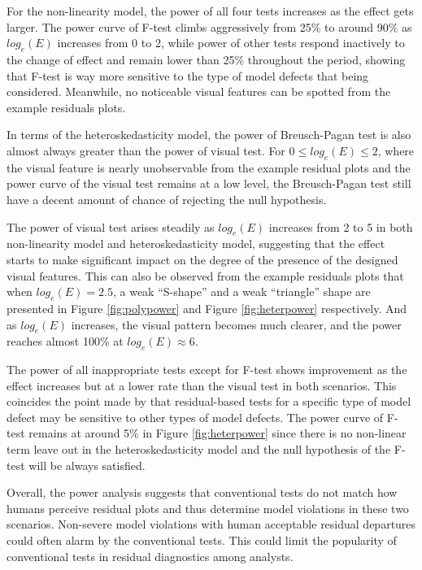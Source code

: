 \documentclass[]{interact}
\theoremstyle{plain}%
\theoremstyle{definition}
\theoremstyle{remark}
\begin{document}
For the non-linearity model, the power of all four tests increases as
the effect gets larger. The power curve of F-test climbs aggressively
from 25\% to around 90\% as \(log_e(E)\) increases from 0 to 2, while
power of other tests respond inactively to the change of effect and
remain lower than 25\% throughout the period, showing that F-test is way
more sensitive to the type of model defects that being considered.
Meanwhile, no noticeable visual features can be spotted from the example
residuals plots.

In terms of the heteroskedasticity model, the power of Breusch-Pagan
test is also almost always greater than the power of visual test. For
\(0 \leq log_e(E) \leq 2\), where the visual feature is nearly
unobservable from the example residual plots and the power curve of the
visual test remains at a low level, the Breusch-Pagan test still have a
decent amount of chance of rejecting the null hypothesis.

The power of visual test arises steadily as \(log_e(E)\) increases from
2 to 5 in both non-linearity model and heteroskedasticity model,
suggesting that the effect starts to make significant impact on the
degree of the presence of the designed visual features. This can also be
observed from the example residuals plots that when \(log_e(E) = 2.5\),
a weak ``S-shape'' and a weak ``triangle'' shape are presented in Figure
\ref{fig:polypower} and Figure \ref{fig:heterpower} respectively. And as
\(log_e(E)\) increases, the visual pattern becomes much clearer, and the
power reaches almost 100\% at \(log_e(E) \approx 6\).

The power of all inappropriate tests except for F-test shows improvement
as the effect increases but at a lower rate than the visual test in both
scenarios. This coincides the point made by \citet{cook1982residuals}
that residual-based tests for a specific type of model defect may be
sensitive to other types of model defects. The power curve of F-test
remains at around 5\% in Figure \ref{fig:heterpower} since there is no
non-linear term leave out in the heteroskedasticity model and the null
hypothesis of the F-test will be always satisfied.

Overall, the power analysis suggests that conventional tests do not
match how humans perceive residual plots and thus determine model
violations in these two scenarios. Non-severe model violations with
human acceptable residual departures could often alarm by the
conventional tests. This could limit the popularity of conventional
tests in residual diagnostics among analysts.
\end{document}

